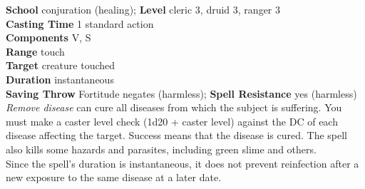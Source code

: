 \textbf{School }conjuration (healing); \textbf{Level }cleric 3, druid 3, ranger 3\\
\textbf{Casting Time }1 standard action\\
\textbf{Components }V, S\\
\textbf{Range }touch\\
\textbf{Target }creature touched\\
\textbf{Duration }instantaneous\\
\textbf{Saving Throw }Fortitude negates (harmless); \textbf{Spell Resistance }yes (harmless)\\
\textit{Remove disease }can cure all diseases from which the subject is suffering. You must make a caster level check (1d20 + caster level) against the DC of each disease affecting the target. Success means that the disease is cured. The spell also kills some hazards and parasites, including green slime and others.\\
Since the spell's duration is instantaneous, it does not prevent reinfection after a new exposure to the same disease at a later date.\\
